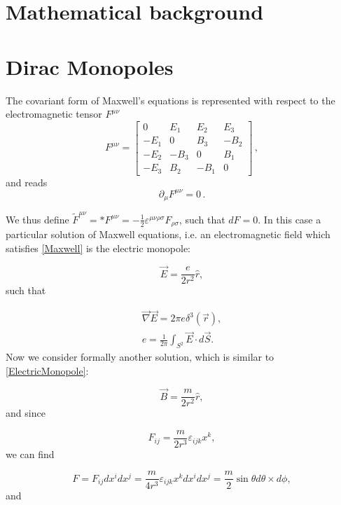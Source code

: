 \documentclass[main.tex]{subfiles}
\begin{document}
\section{Mathematical background}


\section{Dirac Monopoles}
The covariant form of Maxwell's equations is represented with respect to  the electromagnetic tensor $F^{\mu \nu}$
%
\begin{equation}
  F^{\mu\nu} = \begin{bmatrix}
  0   & E_1  & E_2  & E_3 \\
  -E_1   & 0  & B_3  & -B_2 \\
  -E_2   & -B_3  & 0  & B_1 \\
  -E_3   & B_2  & -B_1  & 0
  \end{bmatrix}\,,
\end{equation}
%
and reads
\begin{equation}\label{Maxwell}
\partial_{\mu}F^{\mu \nu}=0\,.
\end{equation}

We thus define
$\tilde{F}^{\mu\nu}=*F^{\mu\nu}=-\frac{1}{2}\varepsilon^{\mu \nu \rho \sigma}F_{\rho \sigma}$,
such that $dF=0$.
In this case a particular solution of Maxwell equations, i.e. an electromagnetic field which satisfies \eqref{Maxwell} is the electric monopole:

\begin{equation}\label{ElectricMonopole}
\vec E=\frac{e}{2r^2}\hat{r},
\end{equation}
such that

\begin{align}
\vec \nabla \vec E=2\pi e \delta^3(\vec r),\\
e=\frac{1}{2\pi}\int_{S^2}\vec E \cdot d\vec S.
\end{align}
Now we consider formally another solution, which is similar to \eqref{ElectricMonopole}:

\begin{equation}\label{MagneticMonopole}
\vec B=\frac{m}{2r^2}\hat{r},
\end{equation}
and since

\begin{equation}
F_{ij}=\frac{m}{2r^3}\varepsilon_{ijk}x^k,
\end{equation}
we can find

\begin{equation}
F=F_{ij}dx^idx^j=\frac{m}{4r^3}\varepsilon_{ijk}x^kdx^idx^j=\frac{m}{2}\sin\theta d\theta\times d\phi,
\end{equation}
and
\end{document}
